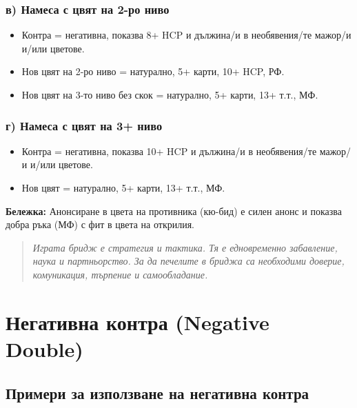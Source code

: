 \documentclass[10pt,a5paper]{extarticle}
\begin{document}
\subsubsection*{в) Намеса с цвят на 2-ро ниво}
\begin{itemize}
  \item[] Контра = негативна, показва 8+ HCP и дължина/и в необявения/те мажор/и и/или цветове.
  \item[] Нов цвят на 2-ро ниво = натурално, 5+ карти, 10+ HCP, РФ.
  \item[] Нов цвят на 3-то ниво без скок = натурално, 5+ карти, 13+ т.т., МФ.
\end{itemize}

\subsubsection*{г) Намеса с цвят на 3+ ниво}
\begin{itemize}
  \item[] Контра = негативна, показва 10+ HCP и дължина/и в необявения/те мажор/и и/или цветове.
  \item[] Нов цвят = натурално, 5+ карти, 13+ т.т., МФ.
\end{itemize}

\bigskip
\textbf{Бележка:}  
Анонсиране в цвета на противника (кю-бид) е силен анонс и показва добра ръка (МФ) с фит в цвета на открилия.

\begin{quote}
\textit{Играта бридж е стратегия и тактика. Тя е едновременно забавление, наука и партньорство.  
За да печелите в бриджа са необходими доверие, комуникация, търпение и самообладание.}
\end{quote}
\newpage
\section{Негативна контра (Negative Double)}

\subsection*{Примери за използване на негативна контра}
\end{document}
